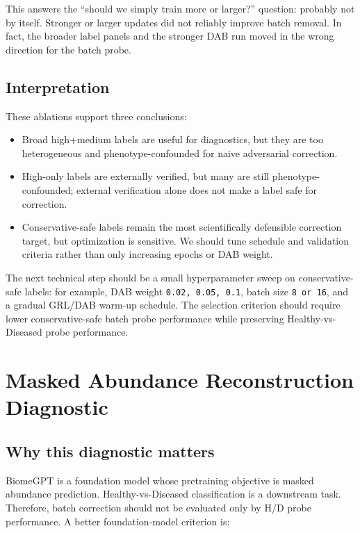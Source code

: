 \documentclass[11pt]{article}
\newcommand{\code}[1]{\texttt{\small #1}}
\begin{document}
This answers the ``should we simply train more or larger?'' question: probably not by
itself. Stronger or larger updates did not reliably improve batch removal. In fact, the
broader label panels and the stronger DAB run moved in the wrong direction for the batch
probe.

\subsection{Interpretation}

These ablations support three conclusions:

\begin{itemize}
  \item Broad high+medium labels are useful for diagnostics, but they are too heterogeneous
  and phenotype-confounded for naive adversarial correction.
  \item High-only labels are externally verified, but many are still phenotype-confounded;
  external verification alone does not make a label safe for correction.
  \item Conservative-safe labels remain the most scientifically defensible correction
  target, but optimization is sensitive. We should tune schedule and validation criteria
  rather than only increasing epochs or DAB weight.
\end{itemize}

The next technical step should be a small hyperparameter sweep on conservative-safe labels:
for example, DAB weight \code{0.02, 0.05, 0.1}, batch size \code{8 or 16}, and a gradual
GRL/DAB warm-up schedule. The selection criterion should require lower conservative-safe
batch probe performance while preserving Healthy-vs-Diseased probe performance.

\section{Masked Abundance Reconstruction Diagnostic}

\subsection{Why this diagnostic matters}

BiomeGPT is a foundation model whose pretraining objective is masked abundance prediction.
Healthy-vs-Diseased classification is a downstream task. Therefore, batch correction should
not be evaluated only by H/D probe performance. A better foundation-model criterion is:
\end{document}
